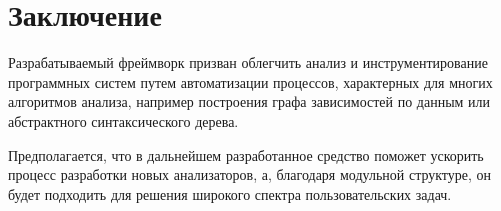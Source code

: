 \section{Заключение} %

Разрабатываемый фреймворк призван облегчить анализ и инструментирование
программных систем путем автоматизации процессов, характерных для многих
алгоритмов анализа, например построения графа зависимостей по данным или
абстрактного синтаксического дерева.

Предполагается, что в дальнейшем разработанное средство поможет ускорить
процесс разработки новых анализаторов, а, благодаря модульной структуре, он
будет подходить для решения широкого спектра пользовательских задач.
